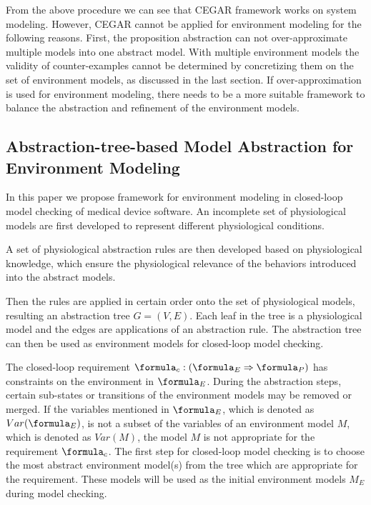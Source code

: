 From the above procedure we can see that CEGAR framework works on system modeling. However, CEGAR cannot be applied for environment modeling for the following reasons. First, the proposition abstraction can not over-approximate multiple models into one abstract model. 
With multiple environment models the validity of counter-examples cannot be determined by concretizing them on the set of environment models, as discussed in the last section. If over-approximation is used for environment modeling, there needs to be a more suitable framework to balance the abstraction and refinement of the environment models.

\subsection{Abstraction-tree-based Model Abstraction for Environment Modeling}
In this paper we propose framework for environment modeling in closed-loop model checking of medical device software. An incomplete set of physiological models are first developed to represent different physiological conditions. 

A set of physiological abstraction rules are then developed based on physiological knowledge, which ensure the physiological relevance of the behaviors introduced into the abstract models. 

Then the rules are applied in certain order onto the set of physiological models, resulting an abstraction tree $G=(V,E)$. Each leaf in the tree is a physiological model and the edges are applications of an abstraction rule. The abstraction tree can then be used as environment models for closed-loop model checking.

The closed-loop requirement $\formula_c:(\formula_E\Rightarrow\formula_P)$ has constraints on the environment in $\formula_E$. During the abstraction steps, certain sub-states or transitions of the environment models may be removed or merged. If the variables mentioned in $\formula_E$, which is denoted as $Var(\formula_E)$, is not a subset of the variables of an environment model $M$, which is denoted as $Var(M)$, the model $M$ is not appropriate for the requirement $\formula_c$. The first step for closed-loop model checking is to choose the most abstract environment model(s) from the tree which are appropriate for the requirement. These models will be used as the initial environment models $M_E$ during model checking. 

